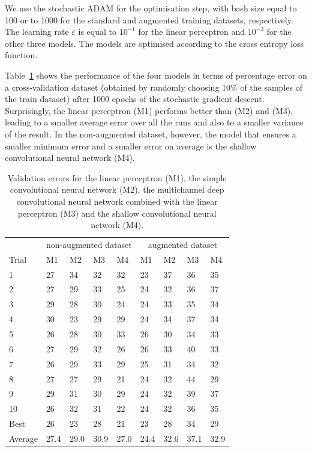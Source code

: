 \documentclass{article}
\begin{document}

We use the stochastic ADAM for the optimisation step, with bash size equal to 100 or to 1000  for the standard and augmented training datasets, respectively. 
The learning rate $\varepsilon$ is equal to  $10^{-1}$ for the linear perceptron and $10^{-3}$ for the other three models.
The models are optimised according to the cross entropy loss function. 

Table~\ref{tab_results} shows the performance of the four models in terms of percentage error on a cross-validation dataset (obtained by randomly choosing 10\% of the samples of the train dataset) after 1000 epochs of the stochastic gradient descent. 
Surprisingly, the linear perceptron (M1) performs better than (M2) and (M3), leading to a smaller average error over all the runs and also to a smaller variance of the result. 
In the non-augmented dataset, however, the model that ensures a smaller minimum error and a smaller error on average is the shallow convolutional neural network (M4).

 \begin{table}
 \begin{center}
    \begin{tabular}{ l l l l l l l l l}
\toprule
     $ $ & \multicolumn{4}{c}{non-augmented dataset} & \multicolumn{4}{c}{augmented dataset} \\
     \cmidrule(lr){2-5}
     \cmidrule(lr){6-9}
    Trial & M1 & M2 & M3 & M4 & M1 & M2 & M3 & M4  \\
\midrule
    1 & 27 & 34 & 32 & 32 & 23 & 37 & 36 & 35 \\
    2 & 27 & 29 & 33 & 25 & 24 & 32 & 36 & 37 \\
    3 & 29 & 28 & 30 & 24 & 24 & 33 & 35 & 34\\
    4 & 30 & 23 & 29 & 29 & 24 & 34 & 37 & 34\\
    5 & 26 & 28 & 30 & 33 & 26 & 30 & 34 & 33\\
    6 & 27 & 29 & 32 & 26 & 26 & 33 & 40 & 33\\
    7 & 26 & 29 & 33 & 29 & 25 & 31 & 34 & 32\\
    8 & 27 & 27 & 29 & 21 & 24 & 32 & 44 & 29\\
    9 & 29 & 31 & 30 & 29 & 24 & 32 & 39 & 37 \\
    10 & 26 & 32 & 31 & 22 & 24 & 32 & 36 & 35\\
    \midrule
    Best & 26 & 23 & 28 & 21 & 23 & 28 & 34 & 29 \\
    Average & 27.4 & 29.0 & 30.9 & 27.0 & 24.4 & 32.6 & 37.1 & 32.9 \\
\bottomrule
    \end{tabular}
        \caption{Validation errors for the linear perceptron (M1), the simple convolutional neural network (M2), the multichannel deep convolutional neural network combined with the linear perceptron (M3) and the shallow convolutional neural network (M4).\label{tab_results}}
\end{center}
\end{table}
\end{document}
